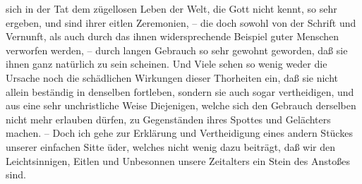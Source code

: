 sich in der Tat dem zügellosen Leben der Welt, die Gott nicht kennt, so sehr
ergeben, und sind ihrer eitlen Zeremonien, -- die doch sowohl von der Schrift
und Vernunft, als auch durch das ihnen widersprechende Beispiel guter Menschen
verworfen werden, -- durch langen Gebrauch so sehr gewohnt geworden, daß sie
ihnen ganz natürlich zu sein scheinen. Und Viele sehen so wenig weder die
Ursache noch die schädlichen Wirkungen dieser Thorheiten ein, daß sie nicht
allein beständig in denselben fortleben, sondern sie auch sogar vertheidigen,
und aus eine sehr unchristliche Weise Diejenigen, welche sich den Gebrauch
derselben nicht mehr erlauben dürfen, zu Gegenständen ihres Spottes und
Gelächters machen. -- Doch ich gehe zur Erklärung und Vertheidigung eines andern
Stückes unserer einfachen Sitte üder, welches nicht wenig dazu beiträgt, daß wir
den Leichtsinnigen, Eitlen und Unbesonnen unsere Zeitalters ein Stein des
Anstoßes sind.

